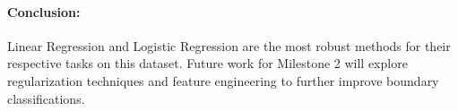 \documentclass[10pt, twocolumn, letterpaper]{article}
\begin{document}
\paragraph{Conclusion:} Linear Regression and Logistic Regression are the most robust methods for their respective tasks on this dataset. Future work for Milestone 2 will explore regularization techniques and feature engineering to further improve boundary classifications.
\end{document}
